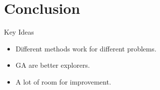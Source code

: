 \documentclass{beamer}
\begin{document}
	\section{Conclusion}
	
	\begin{frame}
		\begin{block}{Key Ideas}
			\begin{itemize}
				\item Different methods work for different problems.
				\item GA are better explorers.
				\item A lot of room for improvement.
			\end{itemize}
		\end{block}
	\end{frame}
	
	

	
\end{document}
